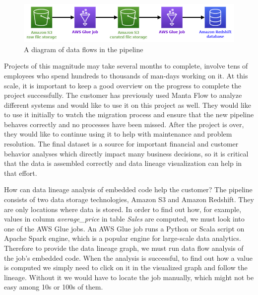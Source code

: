 \begin{figure}[ht]\centering
\includegraphics[width=1.0\textwidth]{img/pipeline_example.png}
\caption{A diagram of data flows in the pipeline}
\label{fig:pipelineExample}
\end{figure}

\par
Projects of this magnitude may take several months to complete, involve tens of employees who spend hundreds to thousands of man-days working on it. At this scale, it is important to keep a good overview on the progress to complete the project successfully. The customer has previously used Manta Flow to analyze different systems and would like to use it on this project as well. They would like to use it initially to watch the migration process and ensure that the new pipeline behaves correctly and no processes have been missed. After the project is over, they would like to continue using it to help with maintenance and problem resolution. The final dataset is a source for important financial and customer behavior analyses which directly impact many business decisions, so it is critical that the data is assembled correctly and data lineage visualization can help in that effort.
\par
How can data lineage analysis of embedded code help the customer? The pipeline consists of two data storage technologies, Amazon S3 and Amazon Redshift. They are only locations where data is stored. In order to find out how, for example, values in column \textit{average\_price} in table \textit{Sales} are computed, we must look into one of the AWS Glue jobs. An AWS Glue job runs a Python or Scala script on Apache Spark engine, which is a popular engine for large-scale data analytics. Therefore to provide the data lineage graph, we must run data flow analysis of the job's embedded code. When the analysis is successful, to find out how a value is computed we simply need to click on it in the visualized graph and follow the lineage. Without it we would have to locate the job manually, which might not be easy among 10s or 100s of them.


